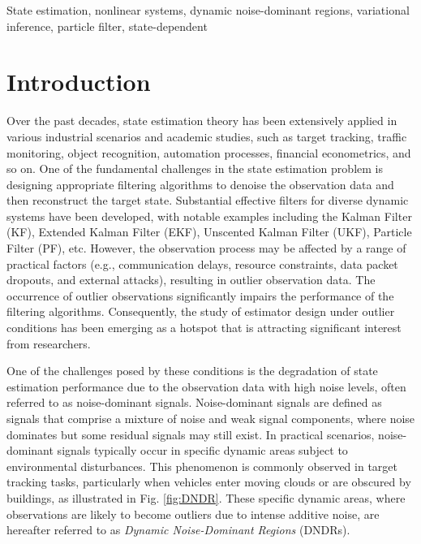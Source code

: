 \documentclass[10pt,twocolumn,twoside]{IEEEtran}
\begin{document}
\begin{IEEEkeywords}
State estimation, nonlinear systems, dynamic noise-dominant regions, variational inference, particle filter, state-dependent
\end{IEEEkeywords}

\section{Introduction} \label{sec:intro}
Over the past decades, state estimation theory has been extensively applied in various industrial scenarios and academic studies, such as target tracking, traffic monitoring, object recognition, automation processes, financial econometrics, and so on\cite{chang1984application,perera2012maritime,denzler2002information,zhang2015survey,lopes2011particle,chen2019distributed}. One of the fundamental challenges in the state estimation problem is designing appropriate filtering algorithms to denoise the observation data and then reconstruct the target state. Substantial effective filters for diverse dynamic systems have been developed, with notable examples including the Kalman Filter (KF)\cite{rigatos2011derivative,shi2014set}, Extended Kalman Filter (EKF)\cite{ljung1979asymptotic,van2011localized}, Unscented Kalman Filter (UKF)\cite{sarkka2007unscented,zhao2017robust}, Particle Filter (PF)\cite{gustafsson2002particle,doucet2001particle,rigatos2009particle}, etc. However, the observation process may be affected by a range of practical factors (e.g., communication delays\cite{schenato2008optimal,wang2024state}, resource constraints\cite{zhang2024direct,huang2024recursive}, data packet dropouts\cite{sun2008optimal,shi2010kalman,hu2012extended}, and external attacks\cite{zhang2024quantization,wang2024distributed}), resulting in outlier observation data. The occurrence of outlier observations significantly impairs the performance of the filtering algorithms. Consequently, the study of estimator design under outlier conditions has been emerging as a hotspot that is attracting significant interest from researchers.

One of the challenges posed by these conditions is the degradation of state estimation performance due to the observation data with high noise levels, often referred to as noise-dominant signals\cite{zheng2021novel,zhou2020empirical,moon2021discrete}. Noise-dominant signals are defined as signals that comprise a mixture of noise and weak signal components, where noise dominates but some residual signals may still exist. In practical scenarios, noise-dominant signals typically occur in specific dynamic areas subject to environmental disturbances. This phenomenon is commonly observed in target tracking tasks, particularly when vehicles enter moving clouds or are obscured by buildings, as illustrated in Fig. \ref{fig:DNDR}. These specific dynamic areas, where observations are likely to become outliers due to intense additive noise, are hereafter referred to as {\it Dynamic Noise-Dominant Regions} (DNDRs).
\end{document}
